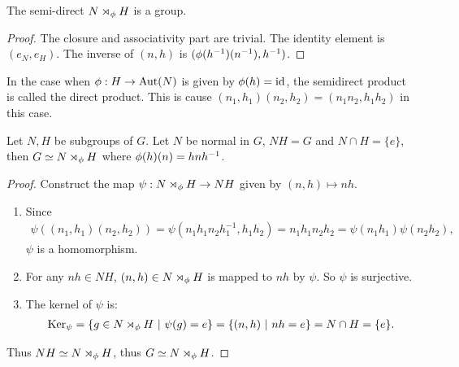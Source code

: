 \begin{proposition}
  The semi-direct $N\rtimes_\phi H$ is a group.
\end{proposition}
\begin{proof}
  The closure and associativity part are trivial. The identity element is $(e_N, e_H)$. The inverse of $(n,h)$ is $(\phi(h^{-1})(n^{-1}), h^{-1})$.
\end{proof}
\begin{remark}
  In the case when $\phi:H \to \text{Aut}(N)$ is given by $\phi(h) = \text{id}$, the semidirect product is called the direct product. This is cause $(n_1,h_1)(n_2,h_2) = (n_1n_2, h_1 h_2)$ in this case.
\end{remark}
\begin{theorem}
  Let $N,H$ be subgroups of $G$. Let $N$ be normal in $G$, $NH = G$ and $N\cap H = \{e\}$, then $G \simeq N\rtimes_\phi H$ where $\phi(h)(n) = hnh^{-1}$.
\end{theorem}
\begin{proof}
 Construct the map $\psi:N\rtimes_\phi H \to NH$ given by $(n,h)\mapsto nh$.
 \begin{enumerate}
   \item Since
     \begin{align*}
       \psi((n_1,h_1)(n_2,h_2)) = \psi(n_1 h_1 n_2 h_1^{-1}, h_1 h_2) = n_1 h_1 n_2 h_2 = \psi(n_1h_1)\psi(n_2h_2),
     \end{align*}
     $\psi$ is a homomorphism.
   \item For any $nh\in NH$, $(n,h)\in N\rtimes_\phi H$ is mapped to $nh$ by $\psi$. So $\psi$ is surjective.
   \item The kernel of $\psi$ is:
     \begin{align*}
       \Ker_\psi = \{g\in N\rtimes_\p H\ |\ \psi(g) = e\} = \{(n,h) \ |\ nh = e\} = N\cap H = \{e\}.
     \end{align*}
 \end{enumerate}
 Thus $NH \simeq N\rtimes_\phi H$, thus $G\simeq N\rtimes_\phi H$.
\end{proof}
